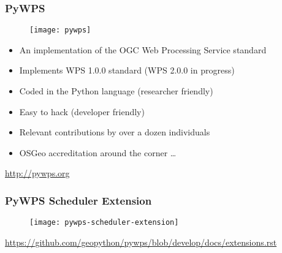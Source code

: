 \documentclass{beamer}
\begin{document}
\begin{frame}
\frametitle<presentation>{PyWPS}

  \begin{figure}[ht]
    \centering
    \texttt{[image: pywps]}
  \end{figure}

  \begin{itemize}
    \item An implementation of the OGC Web Processing Service standard
    \item Implements WPS 1.0.0 standard (WPS 2.0.0 in progress)
    \item Coded in the Python language (researcher friendly)
    \item Easy to hack (developer friendly)
    \item Relevant contributions by over a dozen individuals
    \item OSGeo accreditation around the corner \ldots
  \end{itemize}

  \vspace{0.2cm}
  \centering
  \footnotesize{\url{http://pywps.org}}

\end{frame}

\begin{frame}
\frametitle<presentation>{PyWPS Scheduler Extension}

  \begin{figure}[ht]
    \centering
    \texttt{[image: pywps-scheduler-extension]}
  \end{figure}

  \centering
  \footnotesize{\url{https://github.com/geopython/pywps/blob/develop/docs/extensions.rst}}

\end{frame}
\end{document}
